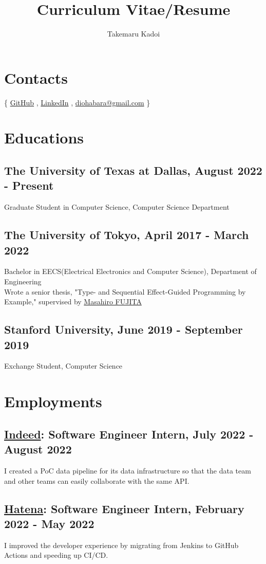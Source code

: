 \documentclass[12pt]{article}
\title{\vspace{-1cm}Curriculum Vitae/Resume}
\author{Takemaru Kadoi}
\date{}
\begin{document}

\section*{Contacts}
  \{
    \href{https://github.com/diohabara/}{GitHub}
    , \href{https://www.linkedin.com/in/takemaru-kadoi}{LinkedIn}
    , \href{mailto:diohabara@gmail.com}{diohabara@gmail.com}
  \}

\section*{Educations}
  \subsection*{The University of Texas at Dallas, August 2022 - Present}
    Graduate Student in Computer Science, Computer Science Department
  \subsection*{The University of Tokyo, April 2017 - March 2022}
    Bachelor in EECS(Electrical Electronics and Computer Science), Department of Engineering \\
    Wrote a senior thesis, "Type- and Sequential Effect-Guided Programming by Example," supervised by \href{https://www.cad.t.u-tokyo.ac.jp/en/}{Masahiro FUJITA}
  \subsection*{Stanford University, June 2019 - September 2019}
    Exchange Student, Computer Science

\section*{Employments}
  \subsection*{\href{https://www.indeed.com/about}{Indeed}: Software Engineer Intern, July 2022 - August 2022}
    I created a PoC data pipeline for its data infrastructure so that the data team and other teams can easily collaborate with the same API.
  \subsection*{\href{https://hatenacorp.jp/}{Hatena}: Software Engineer Intern, February 2022 - May 2022}
    I improved the developer experience by migrating from Jenkins to GitHub Actions and speeding up CI/CD.
\end{document}
